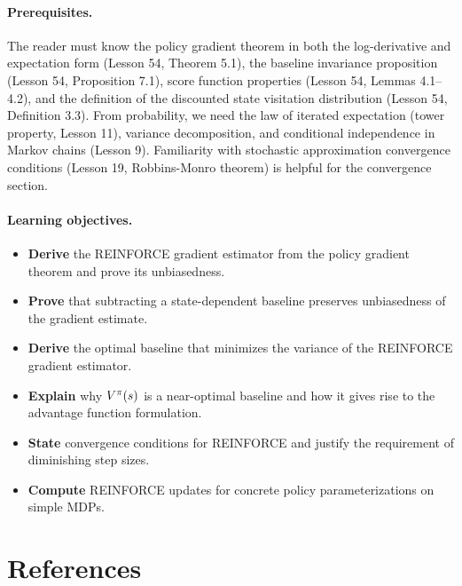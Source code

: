 \documentclass[11pt,a4paper]{article}
\begin{document}
\paragraph{Prerequisites.}
The reader must know the policy gradient theorem in both the
log-derivative and expectation form (Lesson 54,
Theorem 5.1), the baseline invariance proposition
(Lesson 54, Proposition 7.1), score function properties
(Lesson 54, Lemmas 4.1--4.2), and the definition of the discounted
state visitation distribution (Lesson 54, Definition 3.3). From
probability, we need the law of iterated expectation (tower property,
Lesson 11), variance decomposition, and conditional independence in
Markov chains (Lesson 9). Familiarity with stochastic approximation
convergence conditions (Lesson 19, Robbins-Monro theorem) is helpful for
the convergence section.

\paragraph{Learning objectives.}
\begin{itemize}
  \item \textbf{Derive} the REINFORCE gradient estimator from the policy
    gradient theorem and prove its unbiasedness.
  \item \textbf{Prove} that subtracting a state-dependent baseline
    preserves unbiasedness of the gradient estimate.
  \item \textbf{Derive} the optimal baseline that minimizes the variance
    of the REINFORCE gradient estimator.
  \item \textbf{Explain} why $V^{\pi}(s)$ is a near-optimal baseline and
    how it gives rise to the advantage function formulation.
  \item \textbf{State} convergence conditions for REINFORCE and justify
    the requirement of diminishing step sizes.
  \item \textbf{Compute} REINFORCE updates for concrete policy
    parameterizations on simple MDPs.
\end{itemize}

\section{References}
\end{document}
